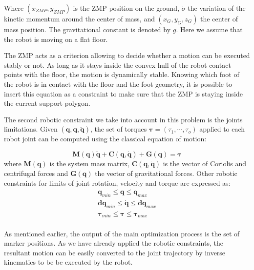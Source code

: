 \documentclass[letterpaper, 10 pt, conference]{ieeeconf}  %
\begin{document}
Where $(x_{ZMP}, y_{ZMP})$ is the ZMP position on the
ground, $\dot{\sigma}$ the variation of the kinetic momentum around
the center of mass, and $(x_G, y_G, z_G)$ the center of mass
position. The gravitational constant is denoted by $g$.
Here we assume that the robot is moving on a flat floor.

The ZMP acts as a criterion allowing to decide whether a motion can be
executed stably or not. As long as it stays inside the convex hull of the
robot contact points with the floor, the motion is dynamically stable.
Knowing which foot of the robot is in contact with the floor and the
foot geometry, it is possible to insert this equation as a constraint
to make sure that the ZMP is staying inside the current support polygon.

The second robotic constraint we take into account in this problem
is the joints limitations. Given $(\mathbf{q}, \dot{\mathbf{q}},
\ddot{\mathbf{q}})$, %
the set of torques  $\mathbf{\tau} = (\tau_1, \cdots, \tau_o)$
applied to each robot joint can be computed using the classical
equation of motion: 

\begin{equation}
  \mathbf{M}(\mathbf{q}) \ddot{\mathbf{q}} + \mathbf{C}(\mathbf{q},
  \dot{\mathbf{q}}) + \mathbf{G}(\mathbf{q}) = \mathbf{\tau}
\end{equation}
where $\mathbf{M}(\mathbf{q})$ is the system mass matrix,
$\mathbf{C}(\mathbf{q}, \dot{\mathbf{q}})$ is the vector of Coriolis
and centrifugal forces and $\mathbf{G}(\mathbf{q})$ the vector of
gravitational forces.
Other robotic constraints for limits of joint rotation, velocity and
torque are expressed as:
\begin{equation}
  \begin{array}{ccc}
    \mathbf{q}_{min} \leq \mathbf{q} \leq \mathbf{q}_{max} \\
    \mathbf{dq}_{min} \leq \dot{\mathbf{q}} \leq \mathbf{dq}_{max} \\
    \mathbf{\tau}_{min} \leq \mathbf{\tau} \leq \mathbf{\tau}_{max} \\
    \end{array}
\end{equation}

As mentioned earlier, the output of the main optimization process is
the set of marker positions. As we have already applied the robotic
constraints, the resultant motion can be easily converted to the 
joint trajectory by inverse kinematics to be be executed by 
the robot. 
\end{document}
